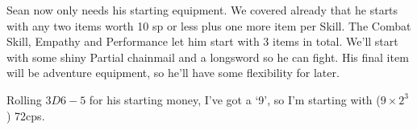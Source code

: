   \begin{exampletext}

    Sean now only needs his starting equipment.
    We covered already that he starts with any two items worth 10 \gls{sp} or less plus one more item per Skill.
    The Combat Skill, Empathy and Performance let him start with 3 items in total.
    We'll start with some shiny Partial chainmail and a longsword so he can fight.
    His final item will be \gls{adventure} equipment, so he'll have some flexibility for later.

  Rolling $3D6-5$ for his starting money, I've got a `9', so I'm starting with ($9\times 2^3$) 72\glspl{cp}.

\end{exampletext}
